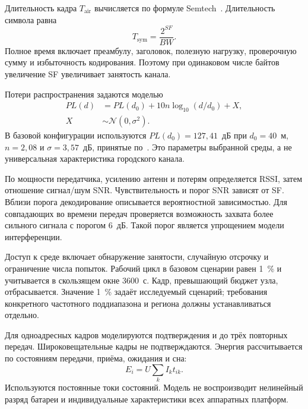 Длительность кадра $T_{\mathrm{air}}$ вычисляется по формуле Semtech~\cite{semtech}. Длительность символа равна
\begin{equation}
  T_{\mathrm{sym}}=\frac{2^{SF}}{BW}.
\end{equation}
Полное время включает преамбулу, заголовок, полезную нагрузку, проверочную сумму и избыточность кодирования. Поэтому при одинаковом числе байтов увеличение SF увеличивает занятость канала.

Потери распространения задаются моделью
\begin{equation}
\begin{split}
  PL(d)&=PL(d_0)+10n\log_{10}(d/d_0)+X,\\
  X&\sim\mathcal{N}(0,\sigma^2).
\end{split}
\end{equation}
В базовой конфигурации используются $PL(d_0)=127{,}41$~дБ при $d_0=40$~м, $n=2{,}08$ и $\sigma=3{,}57$~дБ, принятые по~\cite{bor}. Это параметры выбранной среды, а не универсальная характеристика городского канала.

По мощности передатчика, усилению антенн и потерям определяется RSSI, затем отношение сигнал/шум SNR. Чувствительность и порог SNR зависят от SF. Вблизи порога декодирование описывается вероятностной зависимостью. Для совпадающих во времени передач проверяется возможность захвата более сильного сигнала с порогом 6~дБ. Такой порог является упрощением модели интерференции.

Доступ к среде включает обнаружение занятости, случайную отсрочку и ограничение числа попыток. Рабочий цикл в базовом сценарии равен 1~\% и учитывается в скользящем окне 3600~с. Кадр, превышающий бюджет узла, отбрасывается. Значение 1~\% задаёт исследуемый сценарий; требования конкретного частотного поддиапазона и региона должны устанавливаться отдельно.

Для одноадресных кадров моделируются подтверждения и до трёх повторных передач. Широковещательные кадры не подтверждаются. Энергия рассчитывается по состояниям передачи, приёма, ожидания и сна:
\begin{equation}
  E_i=U\sum_k I_k t_{ik}.
\end{equation}
Используются постоянные токи состояний. Модель не воспроизводит нелинейный разряд батареи и индивидуальные характеристики всех аппаратных платформ.

